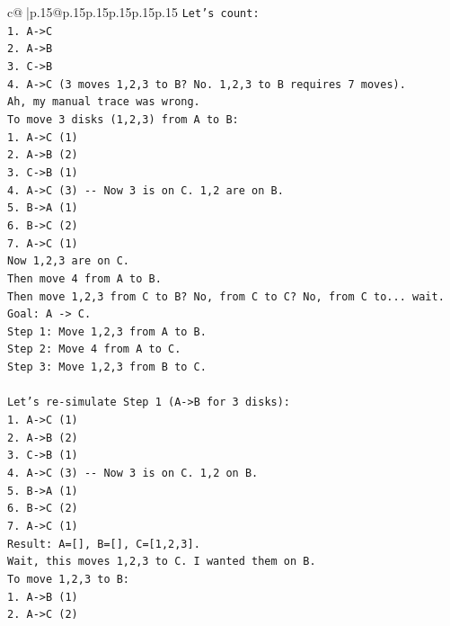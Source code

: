 \documentclass{article}
\begin{document}
{\begin{supertabular}{c@{$\;$}|p{.15\linewidth}@{}p{.15\linewidth}p{.15\linewidth}p{.15\linewidth}p{.15\linewidth}p{.15\linewidth}}
{{{\texttt{Let's count:} \\
\texttt{1. A{-}>C} \\
\texttt{2. A{-}>B} \\
\texttt{3. C{-}>B} \\
\texttt{4. A{-}>C (3 moves 1,2,3 to B? No. 1,2,3 to B requires 7 moves).} \\
\texttt{Ah, my manual trace was wrong.} \\
\texttt{To move 3 disks (1,2,3) from A to B:} \\
\texttt{1. A{-}>C (1)} \\
\texttt{2. A{-}>B (2)} \\
\texttt{3. C{-}>B (1)} \\
\texttt{4. A{-}>C (3) {-}{-} Now 3 is on C. 1,2 are on B.} \\
\texttt{5. B{-}>A (1)} \\
\texttt{6. B{-}>C (2)} \\
\texttt{7. A{-}>C (1)} \\
\texttt{Now 1,2,3 are on C.} \\
\texttt{Then move 4 from A to B.} \\
\texttt{Then move 1,2,3 from C to B? No, from C to C? No, from C to... wait.} \\
\texttt{Goal: A {-}> C.} \\
\texttt{Step 1: Move 1,2,3 from A to B.} \\
\texttt{Step 2: Move 4 from A to C.} \\
\texttt{Step 3: Move 1,2,3 from B to C.} \\
\\ 
\texttt{Let's re{-}simulate Step 1 (A{-}>B for 3 disks):} \\
\texttt{1. A{-}>C (1)} \\
\texttt{2. A{-}>B (2)} \\
\texttt{3. C{-}>B (1)} \\
\texttt{4. A{-}>C (3) {-}{-} Now 3 is on C. 1,2 on B.} \\
\texttt{5. B{-}>A (1)} \\
\texttt{6. B{-}>C (2)} \\
\texttt{7. A{-}>C (1)} \\
\texttt{Result: A={[}{]}, B={[}{]}, C={[}1,2,3{]}.} \\
\texttt{Wait, this moves 1,2,3 to C. I wanted them on B.} \\
\texttt{To move 1,2,3 to B:} \\
\texttt{1. A{-}>B (1)} \\
\texttt{2. A{-}>C (2)} \\
}}}
\end{supertabular}}
\end{document}
